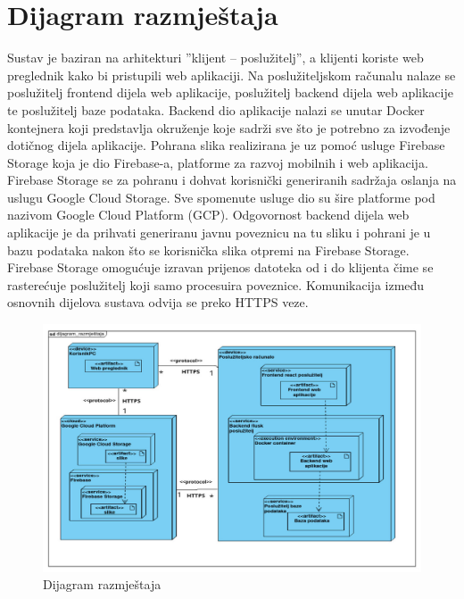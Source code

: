 			\eject 
		
		
		\section{Dijagram razmještaja}
			
			
			 Sustav je baziran na arhitekturi ”klijent – poslužitelj”, a klijenti koriste web preglednik kako bi pristupili web aplikaciji. Na poslužiteljskom računalu nalaze se poslužitelj frontend dijela web aplikacije, poslužitelj backend dijela web aplikacije te poslužitelj baze podataka. Backend dio aplikacije nalazi se unutar Docker kontejnera koji predstavlja okruženje koje sadrži sve što je potrebno za izvođenje dotičnog dijela aplikacije. Pohrana slika realizirana je uz pomoć usluge Firebase Storage koja je dio Firebase-a, platforme za razvoj mobilnih i web aplikacija. Firebase Storage se za pohranu i dohvat korisnički generiranih sadržaja oslanja na uslugu Google Cloud Storage. Sve spomenute usluge dio su šire platforme pod nazivom Google Cloud Platform (GCP). Odgovornost backend dijela web aplikacije je da prihvati generiranu javnu poveznicu na tu sliku i pohrani je u bazu podataka nakon što se korisnička slika otpremi na Firebase Storage. Firebase Storage omogućuje izravan prijenos datoteka od i do klijenta čime se rasterećuje poslužitelj koji samo procesuira poveznice. Komunikacija između osnovnih dijelova sustava odvija se preko HTTPS veze.
			 \begin{figure}[htbp]
				\centering
				\includegraphics[width=1\textwidth]{dijagrami/diagram_razmjestaja_new2.jpeg}
				\caption{Dijagram razmještaja}
			\label{fig:my_image}
			\end{figure}
			\eject 

